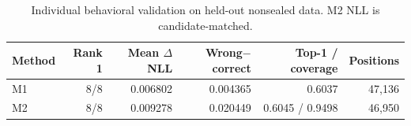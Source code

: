 \begin{table}[t]
\centering
\caption{Individual behavioral validation on held-out nonsealed data. M2 NLL is candidate-matched.}
\label{tab:individual-validation}
\begin{tabular}{lrrrrr}
\toprule
Method & Rank 1 & Mean $\Delta$NLL & Wrong$-$correct & Top-1 / coverage & Positions \\
\midrule
M1 & 8/8 & 0.006802 & 0.004365 & 0.6037 & 47,136 \\
M2 & 8/8 & 0.009278 & 0.020449 & 0.6045 / 0.9498 & 46,950 \\
\bottomrule
\end{tabular}
\end{table}
